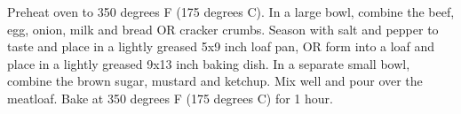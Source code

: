 \begin{recipe}

\begin{recipemeta}
\end{recipemeta}

\begin{recipetext}
Preheat oven to 350 degrees F (175 degrees C).
In a large bowl, combine the beef, egg, onion, milk and bread OR cracker crumbs. Season with salt and pepper to taste and place in a lightly greased 5x9 inch loaf pan, OR form into a loaf and place in a lightly greased 9x13 inch baking dish.
In a separate small bowl, combine the brown sugar, mustard and ketchup. Mix well and pour over the meatloaf.
Bake at 350 degrees F (175 degrees C) for 1 hour.
\end{recipetext}

\end{recipe}
